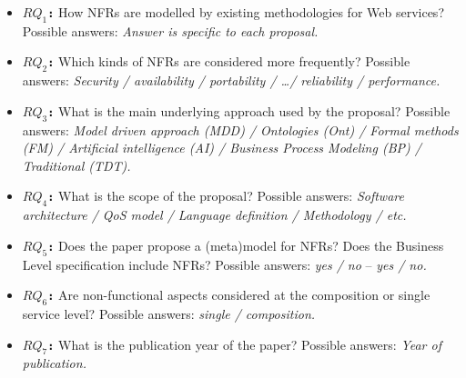 \documentclass{sig-alternate}
\begin{document}
\begin{itemize} 
  \item \textbf{\texttt{$RQ_1$:}} How NFRs are modelled by existing
  methodologies for Web services?
Possible answers: \textit{Answer is specific to each proposal.}
 \item \textbf{\texttt{$RQ_2$:}} Which kinds of NFRs are considered more frequently?
	  Possible answers: \textit{Security / availability / portability / \ldots / reliability /
	  performance.}
  \item \textbf{\texttt{$RQ_3$:}} What is the main underlying approach used by the proposal?
Possible answers: \textit{Model driven approach (MDD) / Ontologies (Ont) / Formal methods (FM) / Artificial intelligence (AI) / Business Process Modeling (BP) / Traditional (TDT).}
  \item \textbf{\texttt{$RQ_4$:}} What is the scope of the proposal?
Possible answers: \textit{Software architecture / QoS model / Language definition / Methodology / etc.}
  \item \textbf{\texttt{$RQ_5$:}} Does the paper propose a (meta)model
  for NFRs? Does the Business Level specification include NFRs?  
Possible answers: \textit{yes / no} -- \textit{yes / no.}
  \item \textbf{\texttt{$RQ_6$:}} Are non-functional aspects considered at the composition or single service level?
Possible answers: \textit{single / composition.}
\item \textbf{\texttt{$RQ_7$:}} What is the publication year of the paper?
Possible answers: \textit{Year of publication.}
\end{itemize}
\end{document}
